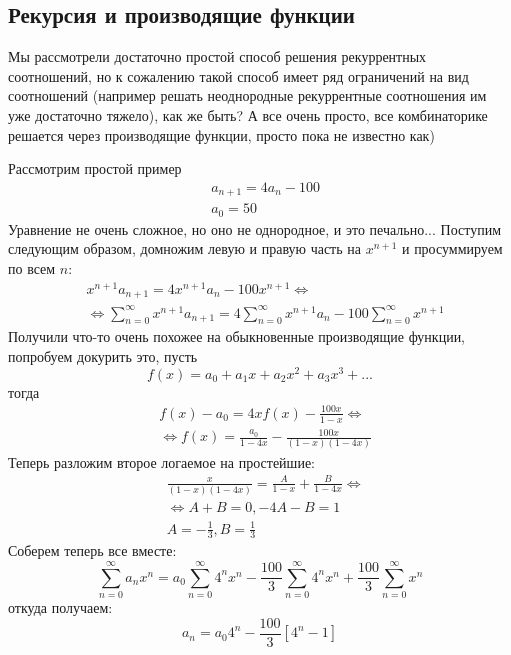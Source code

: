 \subsection{Рекурсия и производящие функции}

Мы рассмотрели достаточно простой способ решения рекуррентных соотношений, но к сожалению такой способ имеет ряд ограничений на вид соотношений (например решать неоднородные рекуррентные соотношения им уже достаточно тяжело), как же быть? А все очень просто, все  комбинаторике решается через производящие функции, просто пока не известно как)

Рассмотрим простой пример
\[
	\begin{split}
		& a_{n+1} = 4 a_n - 100 \\
		& a_0 = 50
	\end{split}
\]
Уравнение не очень сложное, но оно не однородное, и это печально... Поступим следующим образом, домножим левую и правую часть на $x^{n+1}$ и просуммируем по всем $n$:
\[
	\begin{split}
		& x^{n+1} a_{n+1} = 4 x^{n+1} a_n - 100 x^{n+1} \Leftrightarrow \\
		& \Leftrightarrow \sum_{n=0}^{\infty} x^{n+1} a_{n+1} = 4 \sum_{n=0}^{\infty} x^{n+1} a_n - 100 \sum_{n=0}^{\infty} x^{n+1}
	\end{split}
\]
Получили что-то очень похожее на обыкновенные производящие функции, попробуем докурить это, пусть
\[
	f\left(x\right) = a_0 + a_1 x + a_2 x^2 + a_3 x^3 + ...
\]
тогда
\[
	\begin{split}
		& f\left(x\right) - a_0 = 4 x f\left(x\right) - \frac{100 x}{1 - x} \Leftrightarrow \\
		& \Leftrightarrow f\left(x\right) = \frac{a_0}{1 - 4 x} - \frac{100 x}{\left(1 - x\right)\left(1 - 4 x\right)}
	\end{split}
\]
Теперь разложим второе логаемое на простейшие:
\[
	\begin{split}
		& \frac{x}{\left(1 - x\right)\left(1 - 4 x\right)} = \frac{A}{1 - x} + \frac{B}{1 - 4 x} \Leftrightarrow \\
		& \Leftrightarrow A + B = 0, -4 A - B = 1 \\
		& A = -\frac{1}{3}, B = \frac{1}{3}
	\end{split}
\]
Соберем теперь все вместе:
\[
	\sum_{n=0}^{\infty} a_n x^n = a_0 \sum_{n=0}^{\infty} 4^n x^n - \frac{100}{3} \sum_{n=0}^{\infty} 4^n x^n + \frac{100}{3} \sum_{n=0}^{\infty} x^n
\]
откуда получаем:
\[
	a_n = a_0 4^n - \frac{100}{3} \left[4^n - 1\right]
\]

